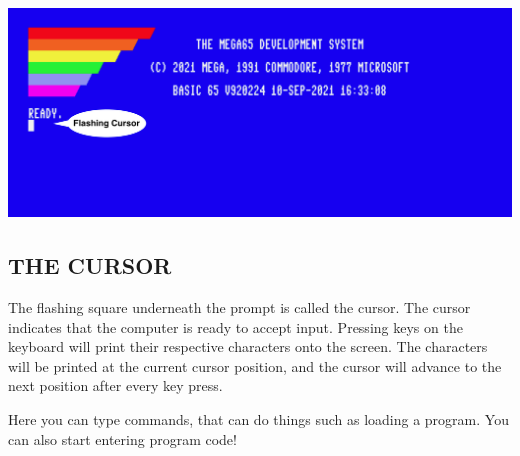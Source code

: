 \includegraphics[width=\linewidth]{images/introduction-screen/switched-on.png}

\subsection{THE CURSOR}

The flashing square underneath the  prompt is called the cursor. The cursor indicates that the computer is ready to accept input. Pressing keys on the keyboard will print their respective characters onto the screen. The characters will be printed at the current cursor position, and the cursor will advance to the next position after every key press.

Here you can type commands, that can do things such as loading a program. You can also start entering program code!
